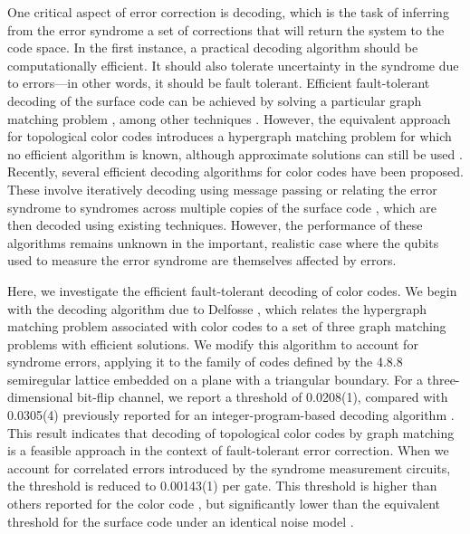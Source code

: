 \documentclass[letterpaper,showpacs,superscriptaddress,twocolumn,aps,prl]{revtex4-1}
\begin{document}
One critical aspect of error correction is decoding, which is the task of inferring from the error syndrome a set of corrections that will return the system to the code space. In the first instance, a practical decoding algorithm should be computationally efficient. It should also tolerate uncertainty in the syndrome due to errors---in other words, it should be fault tolerant. Efficient fault-tolerant decoding of the surface code can be achieved by solving a particular graph matching problem \cite{Dennis2002}, among other techniques \cite{Duclos-Cianci1,Duclos-Cianci2,Wootton1,Bravyi1}. However, the equivalent approach for topological color codes introduces a hypergraph matching problem for which no efficient algorithm is known, although approximate solutions can still be used \cite{Wang10b}. Recently, several efficient decoding algorithms for color codes have been proposed. These involve iteratively decoding using message passing \cite{Sarvepalli1} or relating the error syndrome to syndromes across multiple copies of the surface code \cite{Bombin12,Delfosse1}, which are then decoded using existing techniques. However, the performance of these algorithms remains unknown in the important, realistic case where the qubits used to measure the error syndrome are themselves affected by errors.

Here, we investigate the efficient fault-tolerant decoding of color codes. We begin with the decoding algorithm due to Delfosse \cite{Delfosse1}, which relates the hypergraph matching problem associated with color codes to a set of three graph matching problems with efficient solutions. We modify this algorithm to account for syndrome errors, applying it to the family of codes defined by the 4.8.8 semiregular lattice embedded on a plane with a triangular boundary. For a three-dimensional bit-flip channel, we report a threshold of 0.0208(1), compared with 0.0305(4) previously reported for an integer-program-based decoding algorithm \cite{Landahl1}. This result indicates that decoding of topological color codes by graph matching is a feasible approach in the context of fault-tolerant error correction. When we account for correlated errors introduced by the syndrome measurement circuits, the threshold is reduced to 0.00143(1) per gate. This threshold is higher than others reported for the color code \cite{Landahl1,Wang10b}, but significantly lower than the equivalent threshold for the surface code under an identical noise model \cite{Stephens13}. 
\end{document}
